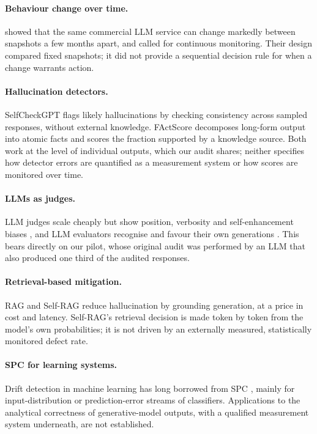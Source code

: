 \documentclass[11pt]{article}
\begin{document}
\paragraph{Behaviour change over time.} \citet{chen2024chatgpt} showed that the same commercial LLM service can change markedly between snapshots a few months apart, and called for continuous monitoring. Their design compared fixed snapshots; it did not provide a sequential decision rule for when a change warrants action.

\paragraph{Hallucination detectors.} SelfCheckGPT \citep{manakul2023selfcheckgpt} flags likely hallucinations by checking consistency across sampled responses, without external knowledge. FActScore \citep{min2023factscore} decomposes long-form output into atomic facts and scores the fraction supported by a knowledge source. Both work at the level of individual outputs, which our audit shares; neither specifies how detector errors are quantified as a measurement system or how scores are monitored over time.

\paragraph{LLMs as judges.} LLM judges scale cheaply but show position, verbosity and self-enhancement biases \citep{zheng2023judge}, and LLM evaluators recognise and favour their own generations \citep{panickssery2024self}. This bears directly on our pilot, whose original audit was performed by an LLM that also produced one third of the audited responses.

\paragraph{Retrieval-based mitigation.} RAG \citep{lewis2020rag} and Self-RAG \citep{asai2024selfrag} reduce hallucination by grounding generation, at a price in cost and latency. Self-RAG's retrieval decision is made token by token from the model's own probabilities; it is not driven by an externally measured, statistically monitored defect rate.

\paragraph{SPC for learning systems.} Drift detection in machine learning has long borrowed from SPC \citep{gama2014survey}, mainly for input-distribution or prediction-error streams of classifiers. Applications to the analytical correctness of generative-model outputs, with a qualified measurement system underneath, are not established.
\end{document}
